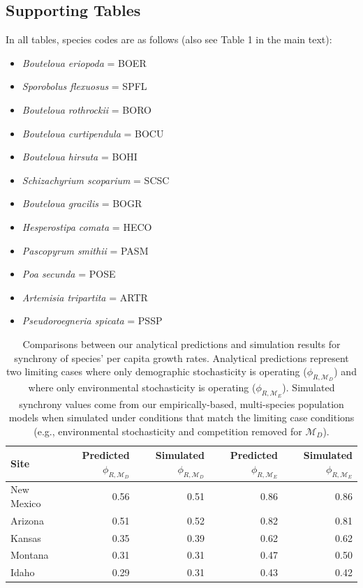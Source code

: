 \documentclass[12pt,]{article}
\begin{document}
\newpage{}

\subsection{Supporting Tables}\label{supporting-tables}

In all tables, species codes are as follows (also see Table 1 in the
main text):

\begin{itemize}
\itemsep1pt\parskip0pt
\item
  \emph{Bouteloua eriopoda} = BOER
\item
  \emph{Sporobolus flexuosus} = SPFL
\item
  \emph{Bouteloua rothrockii} = BORO
\item
  \emph{Bouteloua curtipendula} = BOCU
\item
  \emph{Bouteloua hirsuta} = BOHI
\item
  \emph{Schizachyrium scoparium} = SCSC
\item
  \emph{Bouteloua gracilis} = BOGR
\item
  \emph{Hesperostipa comata} = HECO
\item
  \emph{Pascopyrum smithii} = PASM
\item
  \emph{Poa secunda} = POSE
\item
  \emph{Artemisia tripartita} = ARTR
\item
  \emph{Pseudoroegneria spicata} = PSSP
\end{itemize}

\begin{table}[ht]
\centering
\caption{Comparisons between our analytical predictions and simulation results for synchrony of species' per capita growth rates. Analytical predictions represent two limiting cases where only demographic stochasticity is operating ($\phi_{R,\mathcal{M}_D}$) and where only environmental stochasticity is operating ($\phi_{R,\mathcal{M}_E}$). Simulated synchrony values come from our empirically-based, multi-species population models when simulated under conditions that match the limiting case conditions (e.g., environmental stochasticity and competition removed for $\mathcal{M}_D$).} 
{\normalsize
\begin{tabular}{lrrrr}
  \hline
Site & Predicted $\phi_{R,\mathcal{M}_D}$ & Simulated $\phi_{R,\mathcal{M}_D}$ & Predicted $\phi_{R,\mathcal{M}_E}$ & Simulated $\phi_{R,\mathcal{M}_E}$ \\ 
  \hline
New Mexico & 0.56 & 0.51 & 0.86 & 0.86 \\ 
  Arizona & 0.51 & 0.52 & 0.82 & 0.81 \\ 
  Kansas & 0.35 & 0.39 & 0.62 & 0.62 \\ 
  Montana & 0.31 & 0.31 & 0.47 & 0.50 \\ 
  Idaho & 0.29 & 0.31 & 0.43 & 0.42 \\ 
   \hline
\end{tabular}
}
\end{table}
\end{document}

